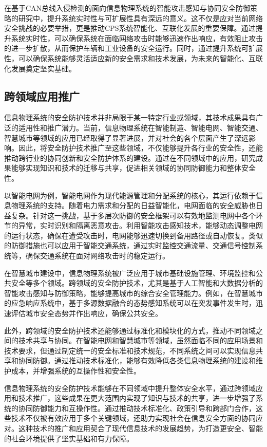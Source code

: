 在基于CAN总线入侵检测的面向信息物理系统的智能攻击感知与协同安全防御策略的研究中，提升系统实时性与可扩展性具有深远的意义。这不仅是应对当前网络安全挑战的必要举措，更是推动CPS系统智能化、互联化发展的重要保障。通过提升系统实时性，可以确保系统在面临网络攻击时能够迅速作出响应，有效阻止攻击的进一步扩散，从而保护车辆和工业设备的安全运行。同时，通过提升系统可扩展性，可以确保系统能够灵活适应新的安全需求和技术发展，为未来的智能化、互联化发展奠定坚实基础。

\subsection{跨领域应用推广}

信息物理系统的安全防护技术并非局限于某一特定行业或领域，其技术成果具有广泛的适用性和推广潜力。当前，信息物理系统在智能制造、智能电网、智能交通、智慧城市等领域的应用已经取得了显著进展，并对社会的各个层面产生了深远影响。因此，将安全防护技术推广至这些领域，不仅能够提升各行业的安全性，还能推动跨行业的协同创新和安全防护体系的建设。通过在不同领域中的应用，研究成果能够实现知识和技术的迁移与共享，促进相关领域的协同防御能力和整体安全性。

以智能电网为例，智能电网作为现代能源管理和分配系统的核心，其运行依赖于信息物理系统的支持。随着电力需求和分配的日益智能化，电网面临的安全威胁也日益复杂。针对这一挑战，基于多层次防御的安全框架可以有效地监测电网中各个环节的异常，实时识别和隔离恶意攻击。利用智能攻击感知技术，能够动态调整电网的运行状态，确保在遭受攻击时，电网能够迅速切换到备用路径或自动恢复。类似的防御措施也可以应用于智能交通系统，通过实时监控交通流量、交通信号控制系统等，确保交通系统在面对网络攻击时的稳定运行。

在智慧城市建设中，信息物理系统被广泛应用于城市基础设施管理、环境监控和公共安全等多个领域。跨领域的安全防护技术，尤其是基于人工智能和大数据分析的智能攻击感知与防御策略，能够提高城市的综合安全管理能力。例如，在智慧城市的应急响应系统中，基于多源数据融合的态势感知系统可以在突发事件发生时，迅速评估城市安全态势并作出响应，确保公共安全。

此外，跨领域的安全防护技术还能够通过标准化和模块化的方式，推动不同领域之间的技术共享与协同。在智能电网和智慧城市等领域，虽然面临不同的应用场景和技术要求，但通过制定统一的安全标准和技术规范，不同系统之间可以实现信息共享和协同防御。通过推动技术标准化，能够有效降低各类信息物理系统的建设和维护成本，并增强系统的互操作性和安全性。

信息物理系统的安全防护技术能够在不同领域中提升整体安全水平，通过跨领域应用和技术推广，这些成果在更大范围内实现了知识与技术的共享，进一步增强了系统的协同防御能力和互操作性。通过推动技术标准化、政策引导和跨部门合作，这些技术不仅被有效应用于多个关键领域，还助力实现社会在信息安全方面的协同应对。这种技术的推广和应用契合了现代信息技术的发展趋势，为打造更安全、智能的社会环境提供了坚实基础和有力保障。

